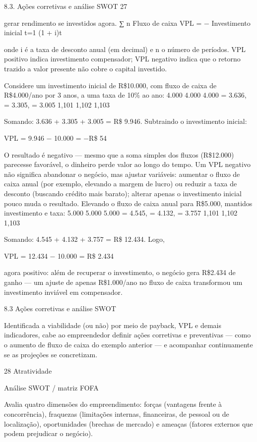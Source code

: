 8.3. Ações corretivas e análise SWOT 27

gerar rendimento se investidos agora. ∑ n Fluxo de caixa VPL = − Investimento inicial t=1 (1 + i)t

onde i é a taxa de desconto anual (em decimal) e n o número de períodos. VPL positivo indica investimento compensador; VPL negativo indica que o retorno trazido a valor presente não cobre o capital investido.

Considere um investimento inicial de R\$10.000, com fluxo de caixa de R\$4.000/ano por 3 anos, a uma taxa de 10\% ao ano: 4.000 4.000 4.000 = 3.636, = 3.305, = 3.005 1,101 1,102 1,103

Somando: 3.636 + 3.305 + 3.005 = R\$ 9.946. Subtraindo o investimento inicial:

VPL = 9.946 − 10.000 = −R\$ 54

O resultado é negativo — mesmo que a soma simples dos fluxos (R\$12.000) parecesse favorável, o dinheiro perde valor ao longo do tempo. Um VPL negativo não significa abandonar o negócio, mas ajustar variáveis: aumentar o fluxo de caixa anual (por exemplo, elevando a margem de lucro) ou reduzir a taxa de desconto (buscando crédito mais barato); alterar apenas o investimento inicial pouco muda o resultado. Elevando o fluxo de caixa anual para R\$5.000, mantidos investimento e taxa: 5.000 5.000 5.000 = 4.545, = 4.132, = 3.757 1,101 1,102 1,103

Somando: 4.545 + 4.132 + 3.757 = R\$ 12.434. Logo,

VPL = 12.434 − 10.000 = R\$ 2.434

agora positivo: além de recuperar o investimento, o negócio gera R\$2.434 de ganho — um ajuste de apenas R\$1.000/ano no fluxo de caixa transformou um investimento inviável em compensador.

8.3 Ações corretivas e análise SWOT

Identificada a viabilidade (ou não) por meio de payback, VPL e demais indicadores, cabe ao empreendedor definir ações corretivas e preventivas — como o aumento de fluxo de caixa do exemplo anterior — e acompanhar continuamente se as projeções se concretizam.

28 Atratividade

Análise SWOT / matriz FOFA

Avalia quatro dimensões do empreendimento: forças (vantagens frente à concorrência), fraquezas (limitações internas, financeiras, de pessoal ou de localização), oportunidades (brechas de mercado) e ameaças (fatores externos que podem prejudicar o negócio).

